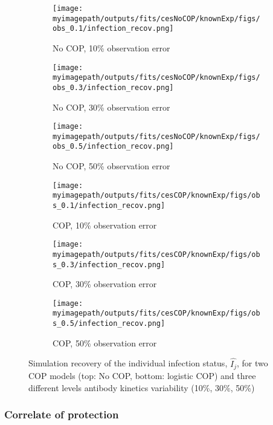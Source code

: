 \begin{figure}[H]
    \centering
    \begin{subfigure}{0.31\textwidth}
        \centering
        \texttt{[image: \\myimagepath/outputs/fits/cesNoCOP/knownExp/figs/obs\_0.1/infection\_recov.png]}
        \caption{No COP, 10\% observation error \label{fit1:inf}}
    \end{subfigure}
    \begin{subfigure}{0.31\textwidth}
        \centering
        \texttt{[image: \\myimagepath/outputs/fits/cesNoCOP/knownExp/figs/obs\_0.3/infection\_recov.png]}
        \caption{No COP, 30\% observation error}
    \end{subfigure}
    \begin{subfigure}{0.31\textwidth}
        \centering
        \texttt{[image: \\myimagepath/outputs/fits/cesNoCOP/knownExp/figs/obs\_0.5/infection\_recov.png]}
        \caption{No COP, 50\% observation error}
    \end{subfigure}
    
  \begin{subfigure}{0.31\textwidth}
        \centering
        \texttt{[image: \\myimagepath/outputs/fits/cesCOP/knownExp/figs/obs\_0.1/infection\_recov.png]}
        \caption{ COP, 10\% observation error}
    \end{subfigure}
    \begin{subfigure}{0.31\textwidth}
        \centering
        \texttt{[image: \\myimagepath/outputs/fits/cesCOP/knownExp/figs/obs\_0.3/infection\_recov.png]}
        \caption{ COP, 30\% observation error}
    \end{subfigure}
    \begin{subfigure}{0.31\textwidth}
        \centering
        \texttt{[image: \\myimagepath/outputs/fits/cesCOP/knownExp/figs/obs\_0.5/infection\_recov.png]}
        \caption{ COP, 50\% observation error}
    \end{subfigure}
    
    \caption{Simulation recovery of the individual infection status, $\hat{I_j}$, for two COP models (top: No COP, bottom: logistic COP) and three different levels antibody kinetics variability (10\%, 30\%, 50\%)}
\end{figure}


\subsubsection{Correlate of protection}


